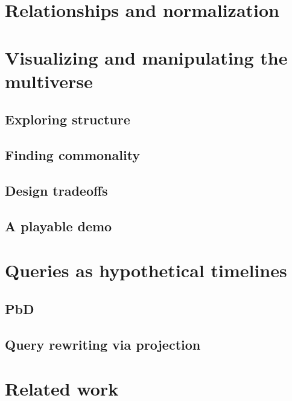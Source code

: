 \documentclass[english,submission]{programming}
\theoremstyle{definition}
\begin{document}
\section{Relationships and normalization}




\section{Visualizing and manipulating the multiverse}

\subsection{Exploring structure}

\subsection{Finding commonality}

\subsection{Design tradeoffs}

\subsection{A playable demo}



\section{Queries as hypothetical timelines}

\subsection{PbD}
\subsection{Query rewriting via projection}


\section{Related work}
\end{document}
